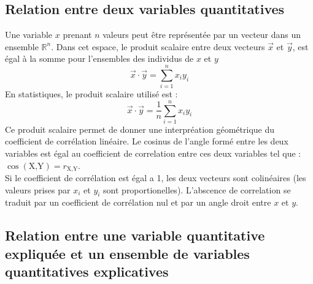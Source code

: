 \documentclass[a4paper]{article}
\begin{document}
\subsection{Relation entre deux variables quantitatives}
Une variable $x$ prenant $n$ valeurs peut être représentée par un vecteur dans un ensemble $\mathbb{R}^n$. Dans cet espace, le produit scalaire
entre deux vecteurs $\vec{x}$ et $\vec{y}$, est égal à la
somme pour l'ensembles des individus de $x$ et $y$ 
\begin{equation*}
    \vec{x} \cdot \vec{y} = \sum_{i = 1}^n x_i y_i 
\end{equation*}
En statistiques, le produit scalaire utilisé est :
\begin{equation*}
    \vec{x} \cdot \vec{y} = \frac{1}{n}\sum_{i = 1}^n x_i y_i 
\end{equation*}
Ce produit scalaire permet de donner une interpréation géométrique du coefficient de corrélation linéaire. Le cosinus de l'angle formé entre les deux
variables est égal au coefficient de correlation entre ces deux variables tel que : $\cos(\text{X,Y}) = r_{\text{X,Y}}$. \\

Si le coefficient de corrélation est égal a 1, les deux vecteurs sont colinéaires (les valeurs prises par $x_i$ et $y_i$ sont proportionelles).
L'abscence de correlation se traduit par un coefficient de corrélation nul et par un angle droit entre $x$ et $y$.
\subsection{Relation entre une variable quantitative expliquée et un ensemble de variables quantitatives explicatives}
\end{document}
